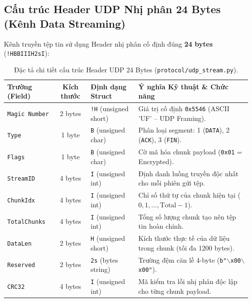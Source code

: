 \documentclass[11pt,a4paper]{article}
\begin{document}
\subsection{Cấu trúc Header UDP Nhị phân 24 Bytes (Kênh Data Streaming)}
Kênh truyền tệp tin sử dụng Header nhị phân cố định đúng \textbf{24 bytes} (\texttt{!HBBIIIH2sI}):

\begin{table}[htbp]
\centering
\small
\begin{tabularx}{\textwidth}{lcp{2.8cm}X}
\toprule
\rowcolor{headergray}
\textbf{Trường (Field)} & \textbf{Kích thước} & \textbf{Định dạng Struct} & \textbf{Ý nghĩa Kỹ thuật \& Chức năng} \\
\midrule
\texttt{Magic Number} & 2 bytes & \texttt{!H} (unsigned short) & Giá trị cố định \texttt{0x5546} (ASCII 'UF' -- UDP Framing). \\
\texttt{Type} & 1 byte & \texttt{B} (unsigned char) & Phân loại segment: 1 (\texttt{DATA}), 2 (\texttt{ACK}), 3 (\texttt{FIN}). \\
\texttt{Flags} & 1 byte & \texttt{B} (unsigned char) & Cờ mã hóa chunk payload (\texttt{0x01} = Encrypted). \\
\texttt{StreamID} & 4 bytes & \texttt{I} (unsigned int) & Định danh luồng truyền độc nhất cho mỗi phiên gửi tệp. \\
\texttt{ChunkIdx} & 4 bytes & \texttt{I} (unsigned int) & Chỉ số thứ tự của chunk hiện tại ($0, 1, \dots, \text{Total}-1$). \\
\texttt{TotalChunks} & 4 bytes & \texttt{I} (unsigned int) & Tổng số lượng chunk tạo nên tệp tin hoàn chỉnh. \\
\texttt{DataLen} & 2 bytes & \texttt{H} (unsigned short) & Kích thước thực tế của dữ liệu trong chunk (tối đa 1200 bytes). \\
\texttt{Reserved} & 2 bytes & \texttt{2s} (bytes string) & Trường đệm căn lề 4-byte (\texttt{b"$\backslash$x00$\backslash$x00"}). \\
\texttt{CRC32} & 4 bytes & \texttt{I} (unsigned int) & Mã kiểm tra lỗi nhị phân độc lập cho từng chunk payload. \\
\bottomrule
\end{tabularx}
\caption{Đặc tả chi tiết cấu trúc Header UDP 24 Bytes (\texttt{protocol/udp_stream.py}).}
\label{tab:udp_header}
\end{table}
\end{document}
